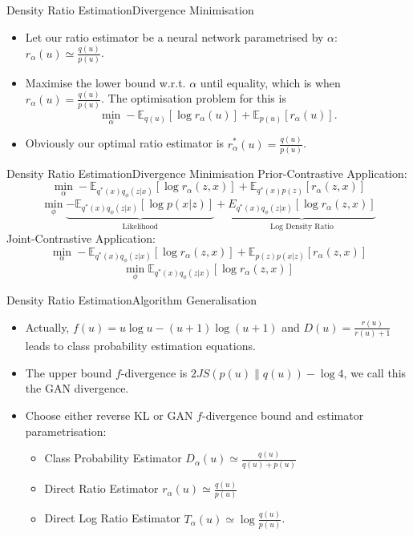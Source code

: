 \documentclass[handout]{beamer}
\newcommand{\E}{\mathbb{E}}
\begin{document}
\begin{frame}{Density Ratio Estimation}{Divergence Minimisation}
\begin{itemize}
\item Let our ratio estimator be a neural network parametrised by $\alpha$: $r_\alpha(u)\simeq \frac{q(u)}{p(u)}$.
\vspace{0.5cm}
\item Maximise the lower bound w.r.t. $\alpha$ until equality, which is when $r_\alpha(u)=\frac{q(u)}{p(u)}$. The optimisation problem for this is
\[\min_\alpha -\mathbb{E}_{q(u)}[\log r_\alpha(u)]+\mathbb{E}_{p(u)}[r_\alpha(u)].\]
\item Obviously our optimal ratio estimator is $r^*_\alpha(u)=\frac{q(u)}{p(u)}$.
\end{itemize}
\end{frame}
\begin{frame}{Density Ratio Estimation}{Divergence Minimisation}
Prior-Contrastive Application:
\[\min_\alpha -\E_{q^*(x)q_\phi(z|x)}[\log r_\alpha(z,x)]+\E_{q^*(x)p(z)}[r_\alpha (z,x)]\]
\[\min_\phi \underbrace{-\mathbb{E}_{q^*(x)q_\phi(z|x)}\left[\log p(x|z)\right]}_\text{Likelihood}+\underbrace{E_{q^*(x)q_\phi (z|x)}[\log r_\alpha(z,x)]}_\text{Log Density Ratio}\]
Joint-Contrastive Application:
\[\min_\alpha-\E_{q^*(x)q_\phi(z|x)}[\log r_\alpha(z,x)]+\E_{p(z)p(x|z)}[r_\alpha(z,x)]\]
\[\min_\phi \mathbb{E}_{q^*(x)q_\phi(z|x)}[\log r_\alpha(z,x)]\]
\end{frame}
\begin{frame}{Density Ratio Estimation}{Algorithm Generalisation}
\begin{itemize}
\item Actually, $f(u)=u\log u-(u+1)\log (u+1)$ and $D(u)=\frac{r(u)}{r(u)+1}$ leads to class probability estimation equations.
\vspace{0.5cm}
\item The upper bound $f$-divergence is $2JS(p(u)\|q(u))-\log 4$, we call this the GAN divergence.
\vspace{0.5cm}
\item Choose either reverse KL or GAN $f$-divergence bound and estimator parametrisation:
\begin{itemize}
\item Class Probability Estimator $D_\alpha(u)\simeq \frac{q(u)}{q(u)+p(u)}$
\item Direct Ratio Estimator $r_\alpha(u)\simeq \frac{q(u)}{p(u)}$
\item Direct Log Ratio Estimator $T_\alpha(u)\simeq\log \frac{q(u)}{p(u)}$.
\end{itemize}
\end{itemize}
\end{frame}
\end{document}
